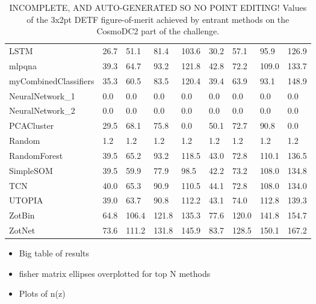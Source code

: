 \documentclass[twocolumn,twocolappendix]{aastex63}
\begin{document}
\begin{table*}[]
\begin{tabular}{l|llll|llll|}
{\sc LSTM } & 26.7 & 51.1    & 81.4    & 103.6    & 30.2             & 57.1             & 95.9             & 126.9\\
{\sc mlpqna } & 39.3 & 64.7    & 93.2    & 121.8    & 42.8             & 72.2             & 109.0             & 133.7\\
{\sc myCombinedClassifiers } & 35.3 & 60.5    & 83.5    & 120.4    & 39.4             & 63.9             & 93.1             & 148.9\\
{\sc NeuralNetwork\_1 } & 0.0 & 0.0    & 0.0    & 0.0    & 0.0             & 0.0             & 0.0             & 0.0\\
{\sc NeuralNetwork\_2 } & 0.0 & 0.0    & 0.0    & 0.0    & 0.0             & 0.0             & 0.0             & 0.0\\
{\sc PCACluster } & 29.5 & 68.1    & 75.8    & 0.0    & 50.1             & 72.7             & 90.8             & 0.0\\
{\sc Random } & 1.2 & 1.2    & 1.2    & 1.2    & 1.2             & 1.2             & 1.2             & 1.2\\
{\sc RandomForest } & 39.5 & 65.2    & 93.2    & 118.5    & 43.0             & 72.8             & 110.1             & 136.5\\
{\sc SimpleSOM } & 39.5 & 59.9    & 77.9    & 98.5    & 42.2             & 73.2             & 108.0             & 134.8\\
{\sc TCN } & 40.0 & 65.3    & 90.9    & 110.5    & 44.1             & 72.8             & 108.0             & 134.0\\
{\sc UTOPIA } & 39.0 & 63.7    & 90.8    & 112.2    & 43.1             & 74.0             & 112.8             & 139.3\\
{\sc ZotBin } & 64.8 & 106.4    & 121.8    & 135.3    & 77.6             & 120.0             & 141.8             & 154.7\\
{\sc ZotNet } & 73.6 & 111.2    & 131.8    & 145.9    & 83.7             & 128.5             & 150.1             & 167.2\\
\end{tabular}
\caption{INCOMPLETE, AND AUTO-GENERATED SO NO POINT EDITING! Values of the 3x2pt DETF figure-of-merit achieved by entrant methods on the 
CosmoDC2 part of the challenge.}
\end{table*}

\begin{itemize}
    \item Big table of results
    \item fisher matrix ellipses overplotted for top N methods
    \item Plots of n(z)
\end{itemize}
\end{document}
